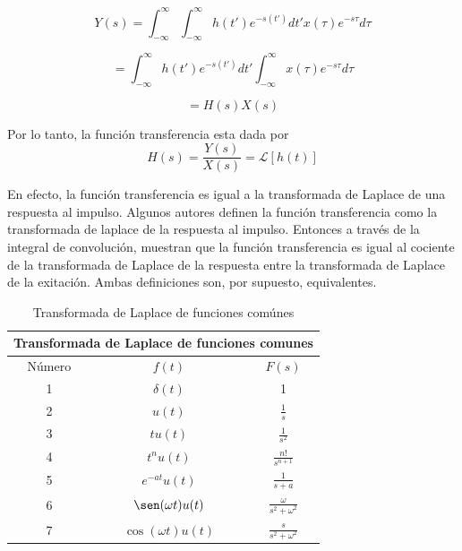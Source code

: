 \documentclass[12pt]{book}
\theoremstyle{definition}
\theoremstyle{remark}
\theoremstyle{plain}
\begin{document}
\begin{equation*}
 Y(s) = \int_{- \infty}^{\infty}  \int_{- \infty}^{\infty} h(t') e^{-s (t')} d t'  x(\tau)  e^{-s \tau}  d \tau 
\end{equation*}

\begin{equation*}
 = \int_{- \infty}^{\infty}   h(t') e^{-s (t')} d t'  \int_{- \infty}^{\infty}  x(\tau)  e^{-s \tau}  d \tau 
\end{equation*}


\begin{equation*}
 = H(s) X(s)
\end{equation*}

Por lo tanto, la función transferencia esta dada por
\begin{equation}
\label{equ405}
 H(s)= \frac{Y(s)}{X(s)}= \mathcal{L} [h(t)]
\end{equation}

En efecto, la función transferencia es igual a la transformada de Laplace de una respuesta al impulso.
Algunos autores definen la función transferencia como la transformada de laplace de la respuesta al impulso. Entonces a través de la integral de convolución, muestran que la función transferencia es igual al cociente de la transformada de Laplace de la respuesta entre la transformada de Laplace de la exitación. Ambas definiciones son, por supuesto, equivalentes.

\begin{table}[!hbt]
\begin{center}
\begin{tabular}{|c|c|c|}
\hline
\multicolumn{3}{|c|}{Transformada de Laplace de funciones comunes}\\
\hline
Número & $f(t)$ & $F(s)$ \\
\hline
\hline
1 & $ \delta (t) $ & 1\\
\hline
2 & $u(t)$ & $\frac{1}{s}$\\
\hline
3 & $t u(t) $ & $\frac{1}{s^2}$ \\
\hline
4 & $t^n u(t)$& $\frac{n !}{s^{n+1}}$  \\
\hline
5 & $e^{-a t} u(t)$ & $\frac{1}{s+a}$ \\
\hline
6 & $\sen (\omega t) u(t) $ & $\frac{\omega}{s^2+\omega ^2}$ \\
\hline
7 & $\cos (\omega t) u(t)$ & $\frac{s}{s^2+\omega ^2} $ \\
\hline
\end{tabular}
\end{center}
\caption[tab1]{Transformada de Laplace de funciones comúnes}
\label{tab1}
\end{table}
\end{document}
